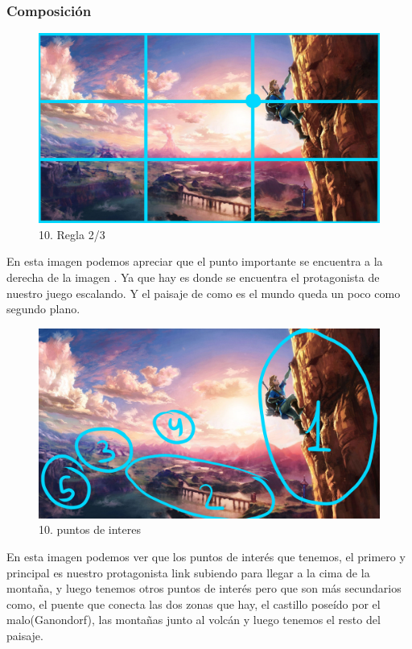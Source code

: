 \documentclass[12pt]{article}
\begin{document}
        \subsubsection{Composición}
        \begin{figure}[H]
          \centering
          \includegraphics[scale=0.35]{images/Selena/10 3.3.jpg}
          \caption{\small 10. Regla 2/3}
        \end{figure}
        En esta imagen podemos apreciar que el punto importante se encuentra a la derecha de la imagen . Ya que hay es donde se encuentra el protagonista de nuestro juego escalando. Y el paisaje de como es el mundo queda un poco como segundo plano. 
        \begin{figure}[H]
          \centering
          \includegraphics[scale=0.35]{images/Selena/10 puntos de interes.jpg}
          \caption{\small 10. puntos de interes}
        \end{figure}
        En esta imagen podemos ver que los puntos de interés que tenemos, el primero y principal es nuestro protagonista link subiendo para llegar a la cima de la montaña, y luego tenemos otros puntos de interés pero que son más secundarios como, el puente que conecta las dos zonas que hay, el castillo poseído por el malo(Ganondorf), las montañas junto al volcán y luego tenemos el resto del paisaje. 
\end{document}
